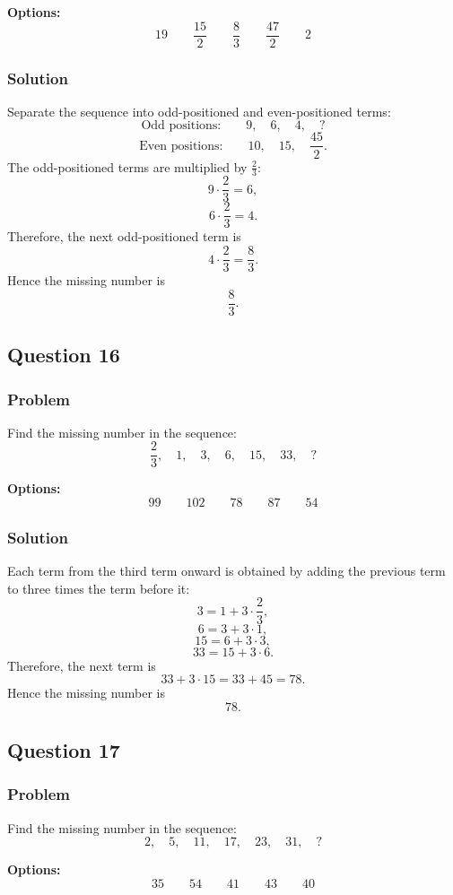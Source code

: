 \documentclass[12pt]{article}
\begin{document}
\noindent\textbf{Options:}
\[
\boxed{19}
\qquad
\boxed{\frac{15}{2}}
\qquad
\boxed{\frac{8}{3}}
\qquad
\boxed{\frac{47}{2}}
\qquad
\boxed{2}
\]

\subsubsection{Solution}
Separate the sequence into odd-positioned and even-positioned terms:
\[
\text{Odd positions:}\qquad 9,\quad 6,\quad 4,\quad ?
\]
\[
\text{Even positions:}\qquad 10,\quad 15,\quad \frac{45}{2}.
\]
The odd-positioned terms are multiplied by \(\frac{2}{3}\):
\[
9\cdot \frac{2}{3}=6,
\]
\[
6\cdot \frac{2}{3}=4.
\]
Therefore, the next odd-positioned term is
\[
4\cdot \frac{2}{3}=\frac{8}{3}.
\]
Hence the missing number is
\[
\boxed{\frac{8}{3}}.
\]

\subsection{Question 16}
\subsubsection{Problem}
Find the missing number in the sequence:
\[
\frac{2}{3},\quad 1,\quad 3,\quad 6,\quad 15,\quad 33,\quad ?
\]

\noindent\textbf{Options:}
\[
\boxed{99}
\qquad
\boxed{102}
\qquad
\boxed{78}
\qquad
\boxed{87}
\qquad
\boxed{54}
\]

\subsubsection{Solution}
Each term from the third term onward is obtained by adding the previous term to three times the term before it:
\[
3=1+3\cdot \frac{2}{3},
\]
\[
6=3+3\cdot 1,
\]
\[
15=6+3\cdot 3,
\]
\[
33=15+3\cdot 6.
\]
Therefore, the next term is
\[
33+3\cdot 15=33+45=78.
\]
Hence the missing number is
\[
\boxed{78}.
\]

\subsection{Question 17}
\subsubsection{Problem}
Find the missing number in the sequence:
\[
2,\quad 5,\quad 11,\quad 17,\quad 23,\quad 31,\quad ?
\]

\noindent\textbf{Options:}
\[
\boxed{35}
\qquad
\boxed{54}
\qquad
\boxed{41}
\qquad
\boxed{43}
\qquad
\boxed{40}
\]
\end{document}
